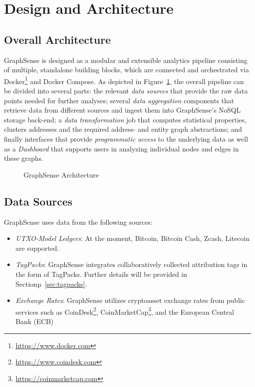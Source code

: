 \section{Design and Architecture}\label{sec:design}

\subsection{Overall Architecture}

GraphSense is designed as a modular and extensible analytics pipeline consisting of multiple, standalone building blocks, which are connected and orchestrated via Docker\footnote{\url{https://www.docker.com}} and Docker Compose. As depicted in Figure~\ref{fig:architecture}, the overall pipeline can be divided into several parts: the relevant \emph{data sources} that provide the raw data points needed for further analyses; several \emph{data aggregation} components that retrieve data from different sources and ingest them into GraphSense's NoSQL storage back-end; a \emph{data transformation} job that computes statistical properties, clusters addresses and the required address- and entity graph abstractions; and finally interfaces that provide \emph{programmatic access} to the underlying data as well as a \emph{Dashboard} that supports users in analyzing individual nodes and edges in these graphs.

\begin{figure}
  \centering
  \caption{GraphSense Architecture}
  \label{fig:architecture}
\end{figure}

\subsection{Data Sources}

GraphSense uses data from the following sources:

\begin{itemize}
  
  \item \emph{UTXO-Model Ledgers}: At the moment, Bitcoin, Bitcoin Cash, Zcash, Litecoin are supported.

  \item \emph{TagPacks}: GraphSense integrates collaboratively collected attribution tags in the form of TagPacks. Further details will be provided in Sectionµ~\ref{sec:tagpacks}.

  \item \emph{Exchange Rates}: GraphSense utilizes cryptoasset exchange rates from public services such as CoinDesk\footnote{\url{https://www.coindesk.com}}, CoinMarketCap\footnote{\url{https://coinmarketcap.com}}, and the European Central Bank (ECB)

\end{itemize}

